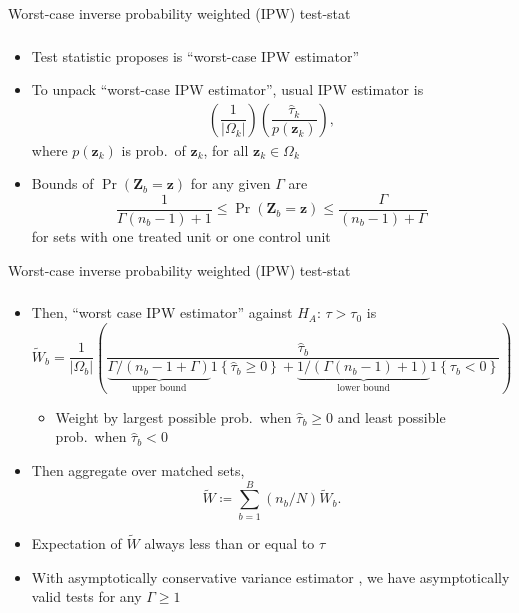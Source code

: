 \documentclass[table, xcolor = {dvipsnames}, 9pt]{beamer}
\theoremstyle{plain}
\begin{document}
\begin{frame}[t]{Worst-case inverse probability weighted (IPW) test-stat}
\frametitle{}
\vfill
\begin{itemize} \vfill
\item Test statistic \citet{fogarty2023} proposes is ``worst-case IPW estimator'' \vfill
\item To unpack ``worst-case IPW estimator'', usual IPW estimator is
\begin{align} \label{eq: strat IPW}
            \left(\dfrac{1}{|\Omega_{k}|}\right) \left(\dfrac{\hat{\tau}_k}{p(\bm{z}_k)}\right),
\end{align}
where $p(\bm{z}_k)$ is prob.~of $\bm{z}_k$, for all $\bm{z}_k \in \Omega_k$ \vfill
\item Bounds of $\Pr\left(\bm{Z}_b = \bm{z}\right)$ for any given $\Gamma$ are  \vfill
\begin{equation*}
\dfrac{1}{\Gamma(n_b - 1) + 1} \leq \Pr(\bm{Z}_b = \bm{z}) \leq \dfrac{\Gamma}{(n_b - 1) + \Gamma}
\end{equation*} \vfill
for sets with one treated unit or one control unit
\vfill
\end{itemize}
\vfill
\end{frame}
\begin{frame}[t]{Worst-case inverse probability weighted (IPW) test-stat}
\frametitle{}
\vfill
\begin{itemize} \vfill
\item Then, ``worst case IPW estimator'' against $H_A: \, \tau > \tau_0$ is \vfill
\small
\begin{equation*}
\widetilde{W}_b = \dfrac{1}{\left\lvert \Omega_b \right \rvert}\left(\dfrac{\hat{\tau}_b}{\underbrace{\Gamma / \left(n_b - 1 + \Gamma\right)}_{\text{upper bound}} 1\left\{\hat{\tau}_b \geq 0\right\} + \underbrace{1 / \left(\Gamma(n_b - 1) + 1\right)}_{\text{lower bound}}1\left\{\tau_b < 0\right\}}\right)
\end{equation*} \normalsize \vfill
\normalsize
\begin{itemize} \vfill
\item Weight by largest possible prob.~when $\hat{\tau}_b \geq 0$ and least possible prob.~when $\hat{\tau}_b < 0$ \vfill
\end{itemize} \vfill
\item Then aggregate over matched sets, \vfill
\begin{equation*}
\widetilde{W} \coloneqq \sum \limits_{b = 1}^B (n_b/N) \widetilde{W}_b.
\end{equation*}
\item Expectation of $\widetilde{W}$ always less than or equal to $\tau$ \vfill
\item With asymptotically conservative variance estimator \citep{fogarty2018,fogarty2023}, we have asymptotically valid tests for any $\Gamma \geq 1$ \vfill
\end{itemize}
\vfill
\end{frame}
\end{document}
